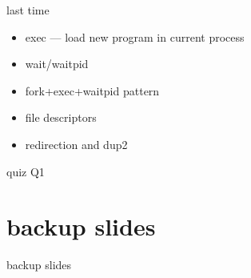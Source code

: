 \date{}
\title{}
\date{}

\begin{frame}
    \titlepage
\end{frame}



\begin{frame}{last time}
    \begin{itemize}
    \item exec --- load new program in current process
    \item wait/waitpid
    \item fork+exec+waitpid pattern
    \item file descriptors
    \item redirection and dup2
    \end{itemize}
\end{frame}

\begin{frame}{quiz Q1}
\end{frame}



\section{backup slides}
\begin{frame}{backup slides}
\end{frame}




